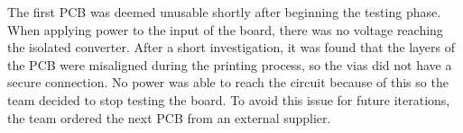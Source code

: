 The first PCB was deemed unusable shortly after beginning the 
testing phase. When applying power to the input of the board, 
there was no voltage reaching the isolated converter. After a 
short investigation, it was found that the layers of the PCB 
were misaligned during the printing process, so the vias did 
not have a secure connection. No power was able to reach the 
circuit because of this so the team decided to stop testing 
the board. To avoid this issue for future iterations, the team 
ordered the next PCB from an external supplier. 